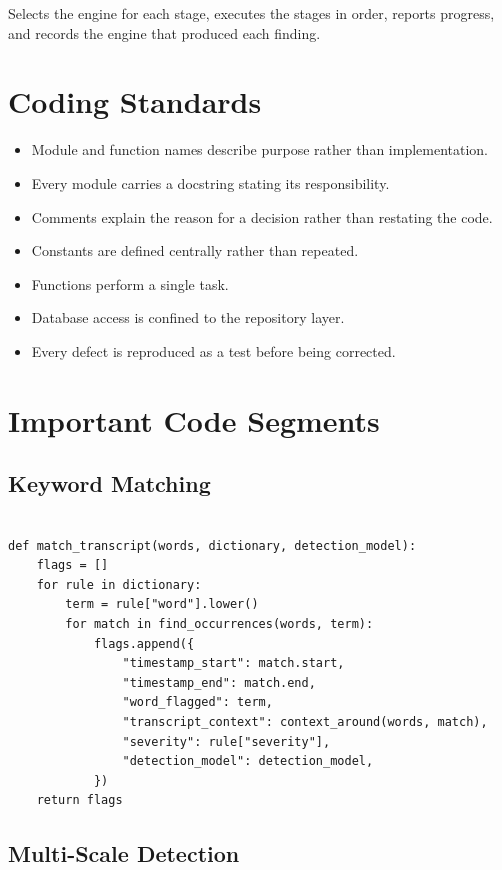 \documentclass[12pt,a4paper,twoside]{report}
\begin{document}
Selects the engine for each stage, executes the stages in order, reports progress, and records the engine that produced each finding.

\section{Coding Standards}

\begin{itemize}
\item Module and function names describe purpose rather than implementation.
\item Every module carries a docstring stating its responsibility.
\item Comments explain the reason for a decision rather than restating the code.
\item Constants are defined centrally rather than repeated.
\item Functions perform a single task.
\item Database access is confined to the repository layer.
\item Every defect is reproduced as a test before being corrected.
\end{itemize}

\section{Important Code Segments}

\subsection{Keyword Matching}

\begin{verbatim}

def match_transcript(words, dictionary, detection_model):
    flags = []
    for rule in dictionary:
        term = rule["word"].lower()
        for match in find_occurrences(words, term):
            flags.append({
                "timestamp_start": match.start,
                "timestamp_end": match.end,
                "word_flagged": term,
                "transcript_context": context_around(words, match),
                "severity": rule["severity"],
                "detection_model": detection_model,
            })
    return flags

\end{verbatim}

\subsection{Multi-Scale Detection}
\end{document}
